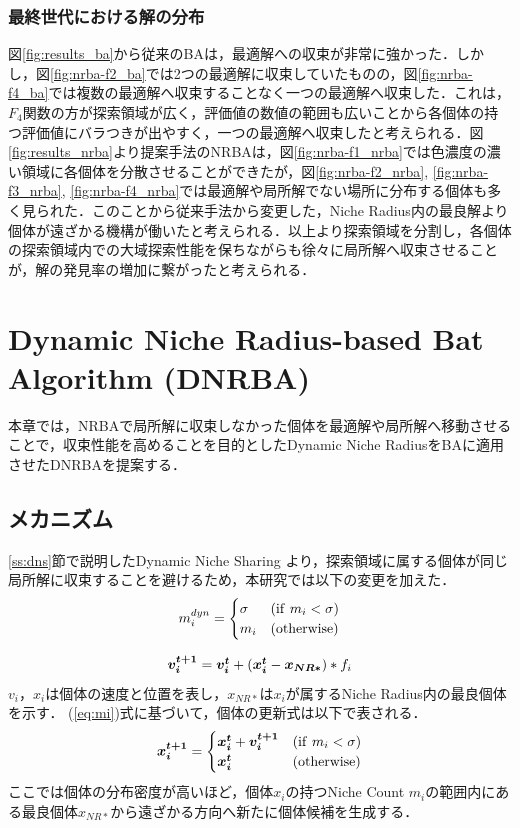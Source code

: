 \documentclass[a4j,11pt]{jarticle}
\begin{document}
\subsubsection{最終世代における解の分布}
\label{sss:dstr_sol} 
図\ref{fig:results_ba}から従来のBAは，最適解への収束が非常に強かった．しかし，図\ref{fig:nrba-f2_ba}では2つの最適解に収束していたものの，図\ref{fig:nrba-f4_ba}では複数の最適解へ収束することなく一つの最適解へ収束した．これは，$F_4$関数の方が探索領域が広く，評価値の数値の範囲も広いことから各個体の持つ評価値にバラつきが出やすく，一つの最適解へ収束したと考えられる．図\ref{fig:results_nrba}より提案手法のNRBAは，図\ref{fig:nrba-f1_nrba}では色濃度の濃い領域に各個体を分散させることができたが，図\ref{fig:nrba-f2_nrba}, \ref{fig:nrba-f3_nrba}, \ref{fig:nrba-f4_nrba}では最適解や局所解でない場所に分布する個体も多く見られた．このことから従来手法から変更した，Niche Radius内の最良解より個体が遠ざかる機構が働いたと考えられる．以上より探索領域を分割し，各個体の探索領域内での大域探索性能を保ちながらも徐々に局所解へ収束させることが，解の発見率の増加に繋がったと考えられる．


\clearpage
\newpage
\section{Dynamic Niche Radius-based Bat Algorithm (DNRBA)}
\label{sec:DNRBA}
本章では，NRBAで局所解に収束しなかった個体を最適解や局所解へ移動させることで，収束性能を高めることを目的としたDynamic Niche RadiusをBAに適用させたDNRBAを提案する．
\subsection{メカニズム}
\label{ss:DNRBA-abst}
\ref{ss:dns}節で説明したDynamic Niche Sharing \cite{DNS} より，探索領域に属する個体が同じ局所解に収束することを避けるため，本研究では以下の変更を加えた．
\begin{equation}
\label{eq:mi}
m_i^{dyn}=\begin{cases}
\sigma & ({\rm if } \ m_i < \sigma) \\
m_i & ({\rm otherwise})
\end{cases}
\end{equation}

\begin{equation}
\label{eq:dnrba-vi}
 \mbox{\boldmath $v_i^{t+1}$} = \mbox{\boldmath $v_i^t$} + (\mbox{\boldmath $x_i^t$}-\mbox{\boldmath $x_{NR*}$})*f_i
\end{equation}
$v_i$，$x_i$は個体の速度と位置を表し，$x_{NR*}$は$x_i$が属するNiche Radius内の最良個体を示す．
(\ref{eq:mi})式に基づいて，個体の更新式は以下で表される．
\begin{equation}
\label{eq:dnrba-xi}
\mbox{\boldmath $x_i^{t+1}$}=\begin{cases}
\mbox{\boldmath $x_i^t$}+\mbox{\boldmath $v_i^{t+1}$} & ({\rm if} \ m_i < \sigma) \\
\mbox{\boldmath $x_i^t$} & ({\rm otherwise})
\end{cases}
\end{equation}
ここでは個体の分布密度が高いほど，個体$x_i$の持つNiche Count $m_i$の範囲内にある最良個体$x_{NR*}$から遠ざかる方向へ新たに個体候補を生成する．
\end{document}
